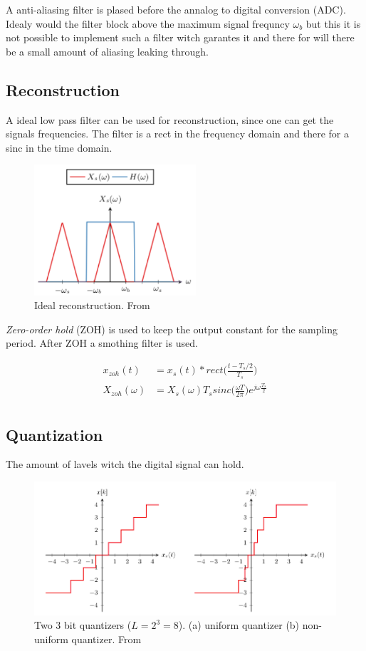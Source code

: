 A anti-aliasing filter is plased before the annalog to digital conversion (ADC).
Idealy would the filter block above the maximum signal frequncy $\omega_b$ but this 
it is not possible to implement such a filter witch garantes it and there for will 
there be a small amount of aliasing leaking through.


\subsection{Reconstruction}
A ideal low pass filter can be used for reconstruction, since one can get the signals frequencies.
The filter is a rect in the frequency domain and there for a sinc in the time domain.
\begin{figure}[!ht]
    \centering
    \includegraphics[width=6cm]{image/ideal_reconstruction.pdf}
    \caption{Ideal reconstruction. From \cite{}}
    \label{fig:ideal_reconstcion}
\end{figure}

\textit{Zero-order hold} (ZOH) is used to keep the output constant for the sampling period.
After ZOH a smothing filter is used.

\begin{align*}
    x_{zoh}(t) &= x_s(t)*rect\Big(\frac{t-T_s/2}{T_s}\Big) \\
    X_{zoh}(\omega) &= X_s(\omega)T_s sinc\Big(\frac{\omega T}{2\pi}\Big)e^{j\omega\frac{T_s}{2}} \\
\end{align*}

\subsection{Quantization}
The amount of lavels witch the digital signal can hold.

\newpage
\begin{figure}[!ht]
    \centering
    \includegraphics[width=12cm]{image/quantization.png}
    \caption{Two 3 bit quantizers ($L=2^3=8$). (a) uniform quantizer (b) non-uniform quantizer. From \cite{}}
    \label{fig:quantization}
\end{figure}




